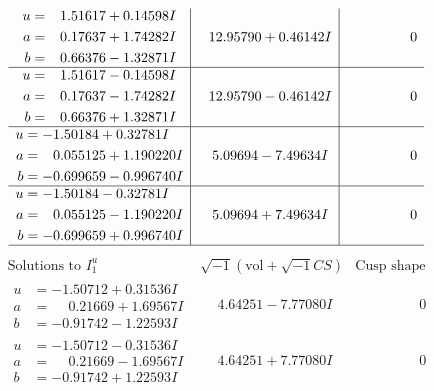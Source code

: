 \documentclass[1p]{elsarticle_modified}
\theoremstyle{definition}
\newcommand{\I}{\sqrt{-1}}
\begin{document}
$$\begin{array}{c|c|c}
\begin{aligned}
u &= \phantom{-}1.51617 + 0.14598 I \\
a &= \phantom{-}0.17637 + 1.74282 I \\
b &= \phantom{-}0.66376 - 1.32871 I\end{aligned}
 & \phantom{-}12.95790 + 0.46142 I & \phantom{-0.000000 } 0 \\ \hline\begin{aligned}
u &= \phantom{-}1.51617 - 0.14598 I \\
a &= \phantom{-}0.17637 - 1.74282 I \\
b &= \phantom{-}0.66376 + 1.32871 I\end{aligned}
 & \phantom{-}12.95790 - 0.46142 I & \phantom{-0.000000 } 0 \\ \hline\begin{aligned}
u &= -1.50184 + 0.32781 I \\
a &= \phantom{-}0.055125 + 1.190220 I \\
b &= -0.699659 - 0.996740 I\end{aligned}
 & \phantom{-}5.09694 - 7.49634 I & \phantom{-0.000000 } 0 \\ \hline\begin{aligned}
u &= -1.50184 - 0.32781 I \\
a &= \phantom{-}0.055125 - 1.190220 I \\
b &= -0.699659 + 0.996740 I\end{aligned}
 & \phantom{-}5.09694 + 7.49634 I & \phantom{-0.000000 } 0\\
 \hline 
 \end{array}$$\newpage$$\begin{array}{c|c|c}  
\text{Solutions to }I^u_{1}& \I (\text{vol} + \sqrt{-1}CS) & \text{Cusp shape}\\
 \hline 
\begin{aligned}
u &= -1.50712 + 0.31536 I \\
a &= \phantom{-}0.21669 + 1.69567 I \\
b &= -0.91742 - 1.22593 I\end{aligned}
 & \phantom{-}4.64251 - 7.77080 I & \phantom{-0.000000 } 0 \\ \hline\begin{aligned}
u &= -1.50712 - 0.31536 I \\
a &= \phantom{-}0.21669 - 1.69567 I \\
b &= -0.91742 + 1.22593 I\end{aligned}
 & \phantom{-}4.64251 + 7.77080 I & \phantom{-0.000000 } 0 \\ \hline\begin{aligned}

\end{aligned}
\end{array}$$
\end{document}
